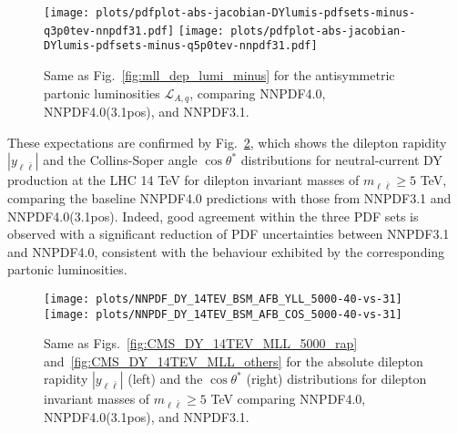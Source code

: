 \begin{figure}[!t]
 \centering
 \texttt{[image: plots/pdfplot-abs-jacobian-DYlumis-pdfsets-minus-q3p0tev-nnpdf31.pdf]}
 \texttt{[image: plots/pdfplot-abs-jacobian-DYlumis-pdfsets-minus-q5p0tev-nnpdf31.pdf]}
 \caption{Same as Fig.~\ref{fig:mll_dep_lumi_minus} for the antisymmetric partonic luminosities $\mathcal{L}_{A,q}$,
   comparing NNPDF4.0, NNPDF4.0(3.1pos), and NNPDF3.1.
 }    
 \label{fig:pdfplot-absDYlumis-pdfsets-minus-q5tev-nnpdf31}
\end{figure}

These expectations are confirmed by
Fig.~\ref{fig:CMS_DY_14TEV_COSTH_5000_YLL40-vs-31}, which shows the
dilepton rapidity $|y_{\ell\bar{\ell}}|$ 
and the Collins-Soper angle $\cos\theta^*$ distributions for neutral-current DY production
at the LHC 14 TeV for dilepton invariant masses of $m_{\ell\bar{\ell}}\ge 5$ TeV,
comparing the baseline NNPDF4.0 predictions with those from NNPDF3.1
and NNPDF4.0(3.1pos).
%
Indeed, 
good agreement within the three PDF sets is observed with a significant reduction
of PDF uncertainties between NNPDF3.1 and NNPDF4.0, consistent
with the behaviour exhibited by the corresponding partonic luminosities.

\begin{figure}[!t]
 \centering
 \texttt{[image: plots/NNPDF\_DY\_14TEV\_BSM\_AFB\_YLL\_5000-40-vs-31]}
 \texttt{[image: plots/NNPDF\_DY\_14TEV\_BSM\_AFB\_COS\_5000-40-vs-31]}
 \caption{Same as Figs.~\ref{fig:CMS_DY_14TEV_MLL_5000_rap}
and~\ref{fig:CMS_DY_14TEV_MLL_others}
for the absolute dilepton rapidity $|y_{\ell\bar{\ell}}|$ (left)
and the $\cos \theta^*$  (right) distributions
for dilepton invariant masses of $m_{\ell\bar{\ell}}\ge 5$ TeV
 comparing
NNPDF4.0, NNPDF4.0(3.1pos), and NNPDF3.1.
 }    
 \label{fig:CMS_DY_14TEV_COSTH_5000_YLL40-vs-31}
\end{figure}

